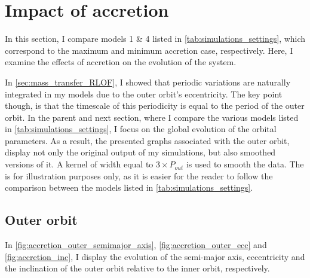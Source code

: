 \section{Impact of accretion}\label{sec:accretion}

In this section, I compare models  1 \& 4 listed in \cref{tab:simulations_settings}, which correspond to the maximum and minimum accretion case, respectively. Here, I examine the effects of accretion on the evolution of the system.

In \cref{sec:mass_transfer_RLOF}, I showed that periodic variations are naturally integrated in my models due to the outer orbit's eccentricity. The key point though, is that the timescale of this periodicity is equal to the period of the outer orbit. In the parent and next section, where I compare the various models listed in \cref{tab:simulations_settings}, I focus on the global evolution of the orbital parameters. As a result, the presented graphs associated with the outer orbit, display not only the original output of my simulations, but also smoothed versions of it. A kernel of width equal to $3 \times P_{out}$ is used to smooth the data. The is for illustration purposes only, as it is easier for the reader to follow the comparison between the models listed in \cref{tab:simulations_settings}. 

\subsection{Outer orbit}

In \cref{fig:accretion_outer_semimajor_axis}, \cref{fig:accretion_outer_ecc} and \cref{fig:accretion_inc}, I display the evolution of the semi-major axis, eccentricity and the inclination of the outer orbit relative to the inner orbit, respectively.

